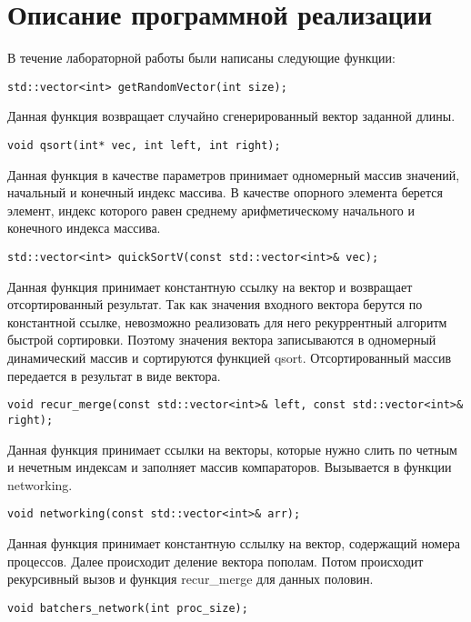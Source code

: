 \documentclass{report}
\begin{document}
\newpage

\section*{Описание программной реализации}
В течение лабораторной работы были написаны следующие функции:
\begin{lstlisting}
std::vector<int> getRandomVector(int size);
\end{lstlisting}
\par Данная функция возвращает случайно сгенерированный вектор заданной длины.
\begin{lstlisting}
void qsort(int* vec, int left, int right);
\end{lstlisting}
\par Данная функция в качестве параметров принимает одномерный массив значений, начальный и конечный индекс массива. В качестве опорного элемента берется элемент, индекс которого равен среднему арифметическому начального и конечного индекса массива.
\begin{lstlisting}
std::vector<int> quickSortV(const std::vector<int>& vec);
\end{lstlisting}
\par Данная функция принимает константную ссылку на вектор и возвращает отсортированный результат. Так как значения входного вектора берутся по константной ссылке, невозможно реализовать для него рекуррентный алгоритм быстрой сортировки. Поэтому значения вектора записываются в одномерный динамический массив и сортируются функцией qsort. Отсортированный массив передается в результат в виде вектора.
\begin{lstlisting}
void recur_merge(const std::vector<int>& left, const std::vector<int>& right);
\end{lstlisting}
\par Данная функция принимает ссылки на векторы, которые нужно слить по четным и нечетным индексам и заполняет массив компараторов. Вызывается в функции networking.
\begin{lstlisting}
void networking(const std::vector<int>& arr);
\end{lstlisting}
\par Данная функция принимает константную сслылку на вектор, содержащий номера процессов. Далее происходит деление вектора пополам. Потом происходит рекурсивный вызов и функция recur\_merge для данных половин.
\begin{lstlisting}
void batchers_network(int proc_size);
\end{lstlisting}
\end{document}
